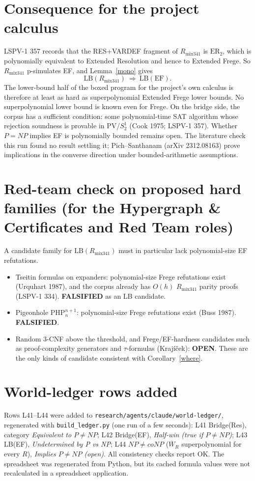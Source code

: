 \documentclass[11pt]{article}
\theoremstyle{definition}
\newcommand{\W}{\overline W}
\begin{document}
\section{Consequence for the project calculus}
LSPV-1 357 records that the RES+VARDEF fragment of $R_{\mathrm{mix341}}$ is $\mathrm{ER}_2$, which is polynomially equivalent to Extended Resolution and hence to Extended Frege. So $R_{\mathrm{mix341}}$ p-simulates EF, and Lemma~\ref{mono} gives
\[
\mathrm{LB}(R_{\mathrm{mix341}})\ \Longrightarrow\ \mathrm{LB}(\mathrm{EF}).
\]
The lower-bound half of the boxed program for the project's own calculus is therefore at least as hard as superpolynomial Extended Frege lower bounds. No superpolynomial lower bound is known even for Frege. On the bridge side, the corpus has a sufficient condition: some polynomial-time SAT algorithm whose rejection soundness is provable in PV/$S^1_2$ (Cook 1975; LSPV-1 357). Whether $P=NP$ implies EF is polynomially bounded remains open. The literature check this run found no result settling it; Pich--Santhanam (arXiv 2312.08163) prove implications in the converse direction under bounded-arithmetic assumptions.

\section{Red-team check on proposed hard families (for the Hypergraph \& Certificates and Red Team roles)}
A candidate family for $\mathrm{LB}(R_{\mathrm{mix341}})$ must in particular lack polynomial-size EF refutations.
\begin{itemize}
\item Tseitin formulas on expanders: polynomial-size Frege refutations exist (Urquhart 1987), and the corpus already has $O(h)$ $R_{\mathrm{mix341}}$ parity proofs (LSPV-1 334). \textbf{FALSIFIED} as an LB candidate.
\item Pigeonhole $\mathrm{PHP}^{n+1}_n$: polynomial-size Frege refutations exist (Buss 1987). \textbf{FALSIFIED}.
\item Random 3-CNF above the threshold, and Frege/EF-hardness candidates such as proof-complexity generators and $\tau$-formulas (Kraj\'i\v{c}ek): \textbf{OPEN}. These are the only kinds of candidate consistent with Corollary~\ref{where}.
\end{itemize}

\section{World-ledger rows added}
Rows L41--L44 were added to \texttt{research/agents/claude/world-ledger/}, regenerated with \texttt{build\_ledger.py} (one run of a few seconds):
L41 Bridge(Res), category \emph{Equivalent to $P\ne NP$};
L42 Bridge(EF), \emph{Half-win (true if $P\ne NP$)};
L43 LB(EF), \emph{Undetermined by P vs NP};
L44 $NP\ne coNP$ ($\W_R$ superpolynomial for every $R$), \emph{Implies $P\ne NP$ (open)}.
All consistency checks report OK. The spreadsheet was regenerated from Python, but its cached formula values were not recalculated in a spreadsheet application.
\end{document}
